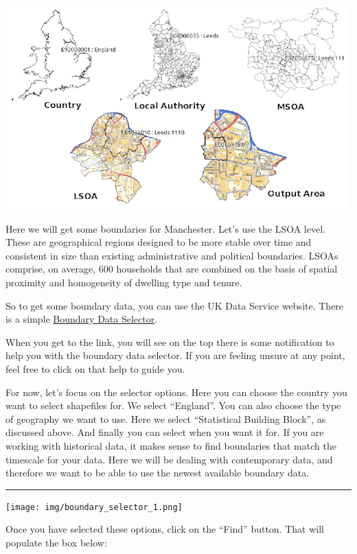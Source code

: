 \documentclass[]{book}
\begin{document}
\includegraphics{img/maps_geography_types.png}

Here we will get some boundaries for Manchester. Let's use the LSOA level. These are geographical regions designed to be more stable over time and consistent in size than existing administrative and political boundaries. LSOAs comprise, on average, 600 households that are combined on the basis of spatial proximity and homogeneity of dwelling type and tenure.

So to get some boundary data, you can use the UK Data Service website. There is a simple \href{https://borders.ukdataservice.ac.uk/bds.html}{Boundary Data Selector}.

When you get to the link, you will see on the top there is some notification to help you with the boundary data selector. If you are feeling unsure at any point, feel free to click on that help to guide you.

For now, let's focus on the selector options. Here you can choose the country you want to select shapefiles for. We select ``England''. You can also choose the type of geography we want to use. Here we select ``Statistical Building Block'', as discussed above. And finally you can select when you want it for. If you are working with historical data, it makes sense to find boundaries that match the timescale for your data. Here we will be dealing with contemporary data, and therefore we want to be able to use the newest available boundary data.

\begin{center}\rule{0.5\linewidth}{0.5pt}\end{center}

\texttt{[image: img/boundary\_selector\_1.png]}

Once you have selected these options, click on the ``Find'' button. That will populate the box below:
\end{document}
